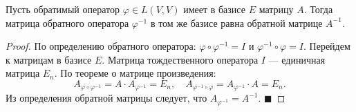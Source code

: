 \begin{theorem}
Пусть обратимый оператор $\varphi \in L(V, V)$ имеет в базисе $E$ матрицу $A$. Тогда матрица обратного оператора $\varphi^{-1}$ в том же базисе равна обратной матрице $A^{-1}$.
\end{theorem}

\begin{proof}
По определению обратного оператора: $\varphi \circ \varphi^{-1} = I$ и $\varphi^{-1} \circ \varphi = I$.
Перейдем к матрицам в базисе $E$. Матрица тождественного оператора $I$ --- единичная матрица $E_n$. По теореме о матрице произведения:
\[
A_{\varphi \circ \varphi^{-1}} = A \cdot A_{\varphi^{-1}} = E_n, \quad A_{\varphi^{-1} \circ \varphi} = A_{\varphi^{-1}} \cdot A = E_n.
\]
Из определения обратной матрицы следует, что $A_{\varphi^{-1}} = A^{-1}$.
\hfill$\blacksquare$
\end{proof}
